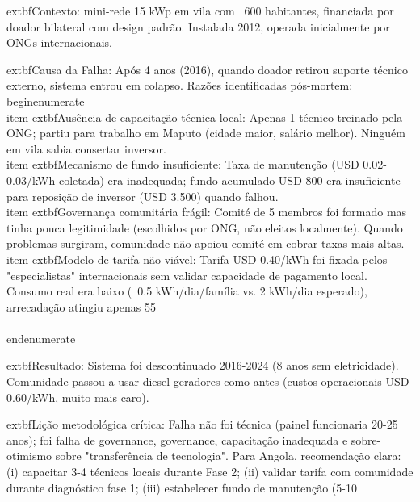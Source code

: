 \documentclass[12pt, a4paper]{article}
\begin{document}
{	extbf{Contexto:} mini-rede 15 kWp em vila com ~600 habitantes, financiada por doador bilateral com design padrão. Instalada 2012, operada inicialmente por ONGs internacionais.

	extbf{Causa da Falha:} Após 4 anos (2016), quando doador retirou suporte técnico externo, sistema entrou em colapso. Razões identificadas pós-mortem:\n\n\\begin{enumerate}
\\item 	extbf{Ausência de capacitação técnica local:} Apenas 1 técnico treinado pela ONG; partiu para trabalho em Maputo (cidade maior, salário melhor). Ninguém em vila sabia consertar inversor.
\\item 	extbf{Mecanismo de fundo insuficiente:} Taxa de manutenção (USD 0.02-0.03/kWh coletada) era inadequada; fundo acumulado USD 800 era insuficiente para reposição de inversor (USD 3.500) quando falhou.
\\item 	extbf{Governança comunitária frágil:} Comité de 5 membros foi formado mas tinha pouca legitimidade (escolhidos por ONG, não eleitos localmente). Quando problemas surgiram, comunidade não apoiou comité em cobrar taxas mais altas.
\\item 	extbf{Modelo de tarifa não viável:} Tarifa USD 0.40/kWh foi fixada pelos "especialistas" internacionais sem validar capacidade de pagamento local. Consumo real era baixo (~0.5 kWh/dia/família vs. 2 kWh/dia esperado), arrecadação atingiu apenas 55\\%
\\end{enumerate}

	extbf{Resultado:} Sistema foi descontinuado 2016-2024 (8 anos sem eletricidade). Comunidade passou a usar diesel geradores como antes (custos operacionais USD 0.60/kWh, muito mais caro).

	extbf{Lição metodológica crítica:} Falha não foi técnica (painel funcionaria 20-25 anos); foi falha de governance, governance, capacitação inadequada e sobre-otimismo sobre "transferência de tecnologia". Para Angola, recomendação clara: (i) capacitar 3-4 técnicos locais durante Fase 2; (ii) validar tarifa com comunidade durante diagnóstico fase 1; (iii) estabelecer fundo de manutenção (5-10\\%

}
\end{document}
